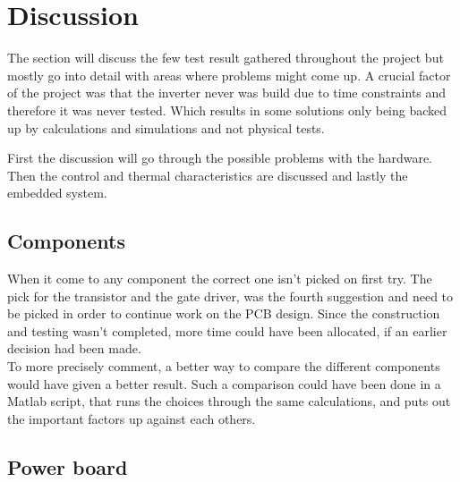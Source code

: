 \section{Discussion}
\label{sec:discussion}

The section will discuss the few test result gathered throughout the project but mostly go into detail with areas where problems might come up.
A crucial factor of the project was that the inverter never was build due to time constraints and therefore it was never tested. Which results in some solutions only being backed up by calculations and simulations and not physical tests.


First the discussion will go through the possible problems with the hardware. Then the control and thermal characteristics are discussed and lastly the embedded system.




\subsection{Components}
When it come to any component the correct one isn't picked on first try. The pick for the transistor and the gate driver, was the fourth suggestion and need to be picked in order to continue work on the PCB design. Since the construction and testing wasn't completed, more time could have been allocated, if an earlier decision had been made. \\

To more precisely comment, a better way to compare the different components would have given a better result. Such a comparison could have been done in a Matlab script, that runs the choices through the same calculations, and puts out the important factors up against each others. \\

\subsection{Power board}
